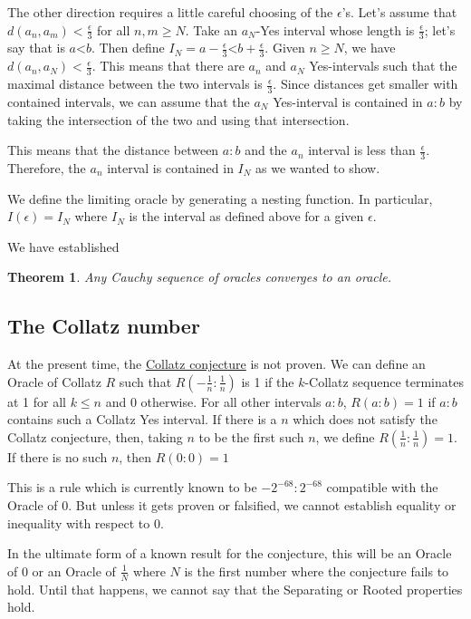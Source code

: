 \documentclass[12pt]{article}
\newtheorem{theorem}{Theorem}
\theoremstyle{remark}
\newcommand{\lt}{\mathord{<}}
\begin{document}
The other direction requires a little careful choosing of the $\epsilon$'s. Let's assume that $d(a_n, a_m) < \frac{\epsilon}{3}$ for all $n, m \geq N$. Take an $a_N$-Yes interval whose length is $\frac{\epsilon}{3}$; let's say that is $a \lt b$. Then define $I_N = a-\frac{\epsilon}{3} \lt b + \frac{\epsilon}{3}$. Given $n \geq N$, we have $d(a_n, a_N) < \frac{\epsilon}{3}$. This means that there are $a_n$ and $a_N$ Yes-intervals such that the maximal distance between the two intervals is $\frac{\epsilon}{3}$. Since distances get smaller with contained intervals, we can assume that the $a_N$ Yes-interval is contained in $a:b$ by taking the intersection of the two and using that intersection. 

This means that the distance between $a:b$ and the $a_n$ interval is less than $\frac{\epsilon}{3}$. Therefore, the $a_n$ interval is contained in $I_N$ as we wanted to show.  

We define the limiting oracle by generating a nesting function. In particular, $I(\epsilon) = I_N$ where $I_N$ is the interval as defined above for a given $\epsilon$.  

We have established

\begin{theorem}\label{th:cauchy}
Any Cauchy sequence of oracles converges to an oracle. 
\end{theorem}



\subsection{The Collatz number}

At the present time, the \href{https://en.wikipedia.org/wiki/Collatz_conjecture}{Collatz conjecture} is not proven. We can define an Oracle of Collatz $R$ such that $R(-\tfrac{1}{n}:\tfrac{1}{n})$ is 1 if the $k$-Collatz sequence terminates at 1 for all $k \leq n$ and 0 otherwise. For all other intervals $a:b$, $R(a:b) = 1$ if $a:b$ contains such a Collatz Yes interval. If there is a $n$ which does not satisfy the Collatz conjecture, then, taking $n$ to be the first such $n$, we define $R(\tfrac{1}{n}:\tfrac{1}{n}) = 1$. If there is no such $n$, then $R(0:0) = 1$

This is a rule which is currently known to be $-2^{-68}:2^{-68}$ compatible with the Oracle of 0. But unless it gets proven or falsified, we cannot establish equality or inequality with respect to 0. 

In the ultimate form of a known result for the conjecture, this will be an Oracle of 0 or an Oracle of $\tfrac{1}{N}$ where $N$ is the first number where the conjecture fails to hold. Until that happens, we cannot say that the Separating or Rooted properties hold. 
\end{document}
